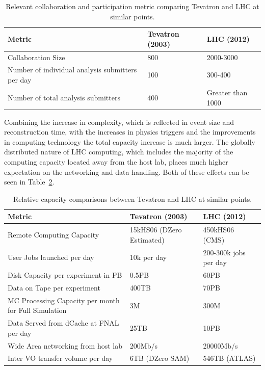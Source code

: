 \begin{table}[t]
\begin{center}
\begin{tabular}{lll}
Metric & Tevatron (2003) & LHC (2012) \\ \hline
Collaboration Size & 800 & 2000-3000 \\
Number of individual analysis submitters per day & 100 & 300-400 \\
Number of total analysis submitters & 400 & Greater than 1000 \\ \hline
\end{tabular}
\caption{Relevant collaboration and participation metric comparing Tevatron and LHC at similar points.}
\label{tab:compare_coll}
\end{center}
\end{table}

Combining the increase in complexity, which is reflected in event size and reconstruction time, with the increases in physics triggers and the improvements in computing technology the total capacity increase is much larger.   The globally distributed nature of LHC computing, which includes the majority of the computing capacity located away from the host lab, places much higher expectation on the networking and data handling.   Both of these effects can be seen in Table~\ref{tab:compare_comp}.

\begin{table}[t]
\begin{center}
\begin{tabular}{lll}
Metric & Tevatron (2003) & LHC (2012) \\ \hline
Remote Computing Capacity & 15kHS06 (DZero Estimated) & 450kHS06 (CMS) \\
User Jobs launched per day & 10k per day & 200-300k jobs per day \\
Disk Capacity per experiment in PB & 0.5PB & 60PB \\
Data on Tape per experiment  & 400TB & 70PB \\
MC Processing Capacity per month for Full Simulation & 3M & 300M \\
Data Served from dCache at FNAL per day & 25TB & 10PB \\
Wide Area networking from host lab & 200Mb/s & 20000Mb/s \\
Inter VO transfer volume per day & 6TB (DZero SAM) & 546TB (ATLAS) \\ \hline
\end{tabular}
\caption{Relative capacity comparisons between Tevatron and LHC at similar points.}
\label{tab:compare_comp}
\end{center}
\end{table}


